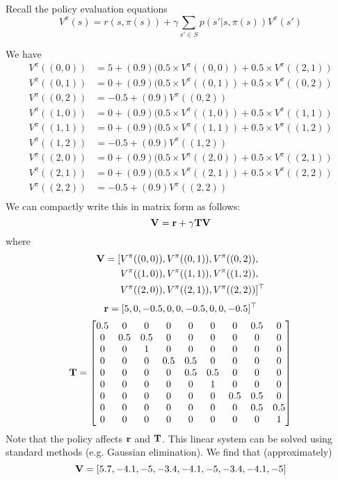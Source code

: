 \documentclass[12pt]{article}
\begin{document}
\vspace{.5pc}


\begin{solution}
 Recall the policy
evaluation equations
$$V^\pi(s) = r(s,\pi(s)) + \gamma \sum_{s' \in S} p(s'|s, \pi(s)) V^\pi(s')$$

We have
\begin{align*}
    V^\pi((0,0)) &= 5 + (0.9)(0.5 \times V^\pi((0,0)) + 0.5 \times V^\pi((2,1)) \\
    V^\pi((0,1)) &= 0 + (0.9)(0.5 \times V^\pi((0,1)) + 0.5 \times V^\pi((0,2)) \\
    V^\pi((0,2)) &= -0.5 + (0.9) V^\pi((0,2))  \\
    V^\pi((1,0)) &= 0 + (0.9)(0.5 \times V^\pi((1,0)) + 0.5 \times V^\pi((1,1)) \\
    V^\pi((1,1)) &= 0 + (0.9)(0.5 \times V^\pi((1,1)) + 0.5 \times V^\pi((1,2)) \\
    V^\pi((1,2)) &= -0.5 + (0.9) V^\pi((1,2))  \\
    V^\pi((2,0)) &= 0 + (0.9)(0.5 \times V^\pi((2,0)) + 0.5 \times V^\pi((2,1)) \\
    V^\pi((2,1)) &= 0 + (0.9)(0.5 \times V^\pi((2,1)) + 0.5 \times V^\pi((2,2)) \\
    V^\pi((2,2)) &= -0.5 + (0.9) V^\pi((2,2)) \\
\end{align*}
We can compactly write this in matrix form as follows:
$$\mathbf{V} = \mathbf{r} + \gamma \mathbf{T} \mathbf{V}$$
where
\begin{align*}
    \mathbf{V} = [&V^\pi((0,0)), V^\pi((0,1)), V^\pi((0,2)), \\
&V^\pi((1,0)), V^\pi((1,1)), V^\pi((1,2)), \\
&V^\pi((2,0)), V^\pi((2,1)), V^\pi((2,2))]^\top
\end{align*}
$$\mathbf{r} = [5, 0, -0.5, 0, 0,-0.5, 0, 0, -0.5]^\top $$
$$\mathbf{T} = \begin{bmatrix}
0.5 & 0 & 0 & 0 & 0 & 0 & 0 & 0.5 & 0 \\
0 & 0.5 & 0.5 & 0 & 0 & 0 & 0 & 0 & 0 \\
0 & 0 & 1 & 0 & 0 & 0 & 0 & 0 & 0 \\
0 & 0 & 0 & 0.5 & 0.5 & 0 & 0 & 0 & 0 \\
0 & 0 & 0 & 0 & 0.5 & 0.5 & 0 & 0 & 0 \\
0 & 0 & 0 & 0 & 0 & 1 & 0 & 0 & 0 \\
0 & 0 & 0 & 0 & 0 & 0 & 0.5 & 0.5 & 0 \\
0 & 0 & 0 & 0 & 0 & 0 & 0 & 0.5 & 0.5 \\
0 & 0 & 0 & 0 & 0 & 0 & 0 & 0 & 1 \\
\end{bmatrix}$$
Note that the policy affects $\mathbf{r}$ and $\mathbf{T}$. This linear system can be solved using standard methods (e.g. Gaussian elimination). We find that (approximately)
$$\mathbf{V} = [ 5.7, -4.1, -5, -3.4, -4.1, -5, -3.4, -4.1, -5]$$
\end{solution}
\end{document}
